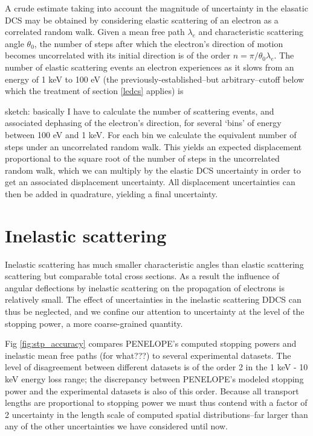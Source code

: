 \documentclass [11pt, proquest, article] {uwthesis}[2016/11/22]
\begin{document}
A crude estimate taking into account the magnitude of uncertainty in the elasatic DCS may be obtained by considering elastic scattering of an electron as a correlated random walk. Given a mean free path $\lambda_e$ and characteristic scattering angle $\theta_0$, the number of steps after which the electron's direction of motion becomes uncorrelated with its initial direction is of the order $n = \pi/\theta_0 \lambda_e$. The number of elastic scattering events an electron experiences as it slows from an energy of 1 keV to 100 eV (the previously-established--but arbitrary--cutoff below which the treatment of section \ref{ledcs} applies) is

sketch: basically I have to calculate the number of scattering events, and associated dephasing of the electron's direction, for several `bins' of energy between 100 eV and 1 keV. For each bin we calculate the equivalent number of steps under an uncorrelated random walk. This yields an expected displacement proportional to the square root of the number of steps in the uncorrelated random walk, which we can multiply by the elastic DCS uncertainty in order to get an associated displacement uncertainty. All displacement uncertainties can then be added in quadrature, yielding a final uncertainty. 


\section{Inelastic scattering}
Inelastic scattering has much smaller characteristic angles than elastic scattering scattering but comparable total cross sections. As a result the influence of angular deflections by inelastic scattering on the propagation of electrons is relatively small. The effect of uncertainties in the inelastic scattering DDCS can thus be neglected, and we confine our attention to uncertainty at the level of the stopping power, a more coarse-grained quantity.

Fig \ref{fig:stp_accuracy} compares PENELOPE's computed stopping powers and inelastic mean free paths (for what???) to several experimental datasets. The level of disagreement between different datasets is of the order 2 in the 1 keV - 10 keV energy loss range; the discrepancy between PENELOPE's modeled stopping power and the experimental datasets is also of this order. Because all transport lengths are proportional to stopping power we must thus contend with a factor of 2 uncertainty in the length scale of computed spatial distributions--far larger than any of the other uncertainties we have considered until now. 
\end{document}
